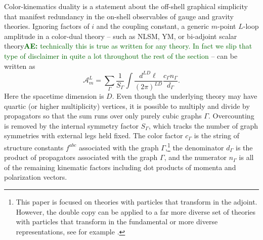 \documentclass[11pt,letter]{article}
\newcommand{\ace}[1]{\textcolor{darkgreen}{\textbf{AE:}{ #1}}}
\begin{document}

Color-kinematics duality is a statement about the off-shell graphical
simplicity that manifest redundancy in the on-shell observables of
gauge and gravity theories. Ignoring factors of $i$ and the coupling
constant, a generic $m$-point $L$-loop amplitude in a color-dual
theory -- such as NLSM, YM, or bi-adjoint scalar
theory\ace{technically this is true as written for any theory.  In
  fact we slip that type of disclaimer in quite a lot throughout the
  rest of the section} -- can be written as
\begin{equation}
\mathcal{A}_m^L = \sum \limits_\Gamma \frac{1}{S_\Gamma} \int \frac{d^{LD}\ell}{(2\pi)^{LD}} \frac{c_\Gamma n_\Gamma}{d_\Gamma} .
\end{equation}
Here the spacetime dimension is $D$.  Even though the underlying
theory may have quartic (or higher multiplicity) vertices, it is
possible to multiply and divide by propagators so that the sum runs
over only purely cubic graphs $\Gamma$.  Overcounting is removed by
the internal symmetry factor $S_\Gamma$, which tracks the number of
graph symmetries with external legs held fixed.  The color factor
$c_\Gamma$ is the string of structure constants $f^{abc}$ associated
with the graph $\Gamma$,\footnote{This paper is focused on theories
  with particles that transform in the adjoint.  However, the double
  copy can be applied to a far more diverse set of theories with
  particles that transform in the fundamental or more diverse
  representations, see for example \cite{Johansson:2017srf,
    Johansson2014zca, Johansson:2015oia, Johansson:2019dnu,
    Carrasco:2023vjg, Carrasco:2020ywq}.}  the denominator $d_\Gamma$
is the product of propagators associated with the graph $\Gamma$, and
the numerator $n_\Gamma$ is all of the remaining kinematic factors
including dot products of momenta and polarization vectors.
\end{document}
